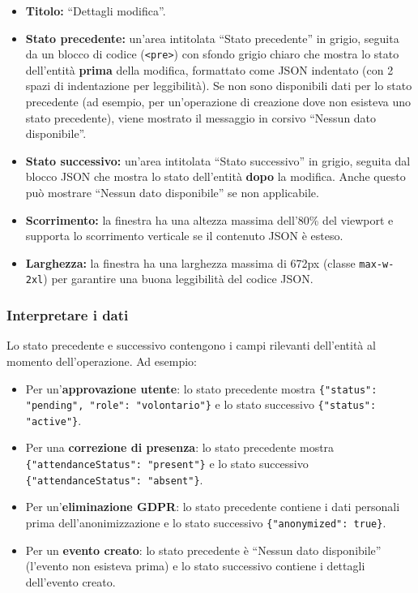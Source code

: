 \documentclass[a4paper,11pt,oneside]{book}
\begin{document}
\begin{itemize}[leftmargin=1.5em]
  \item \textbf{Titolo:} ``Dettagli modifica''.
  \item \textbf{Stato precedente:} un'area intitolata ``Stato precedente'' in grigio, seguita da un blocco di codice (\texttt{<pre>}) con sfondo grigio chiaro che mostra lo stato dell'entit\`a \textbf{prima} della modifica, formattato come JSON indentato (con 2 spazi di indentazione per leggibilit\`a). Se non sono disponibili dati per lo stato precedente (ad esempio, per un'operazione di creazione dove non esisteva uno stato precedente), viene mostrato il messaggio in corsivo ``Nessun dato disponibile''.
  \item \textbf{Stato successivo:} un'area intitolata ``Stato successivo'' in grigio, seguita dal blocco JSON che mostra lo stato dell'entit\`a \textbf{dopo} la modifica. Anche questo pu\`o mostrare ``Nessun dato disponibile'' se non applicabile.
  \item \textbf{Scorrimento:} la finestra ha una altezza massima dell'80\% del viewport e supporta lo scorrimento verticale se il contenuto JSON \`e esteso.
  \item \textbf{Larghezza:} la finestra ha una larghezza massima di 672px (classe \texttt{max-w-2xl}) per garantire una buona leggibilit\`a del codice JSON.
\end{itemize}

\subsubsection{Interpretare i dati}

Lo stato precedente e successivo contengono i campi rilevanti dell'entit\`a al momento dell'operazione. Ad esempio:

\begin{itemize}[leftmargin=1.5em]
  \item Per un'\textbf{approvazione utente}: lo stato precedente mostra \texttt{\{"status": "pending", "role": "volontario"\}} e lo stato successivo \texttt{\{"status": "active"\}}.
  \item Per una \textbf{correzione di presenza}: lo stato precedente mostra \texttt{\{"attendanceStatus": "present"\}} e lo stato successivo \texttt{\{"attendanceStatus": "absent"\}}.
  \item Per un'\textbf{eliminazione GDPR}: lo stato precedente contiene i dati personali prima dell'anonimizzazione e lo stato successivo \texttt{\{"anonymized": true\}}.
  \item Per un \textbf{evento creato}: lo stato precedente \`e ``Nessun dato disponibile'' (l'evento non esisteva prima) e lo stato successivo contiene i dettagli dell'evento creato.
\end{itemize}
\end{document}
